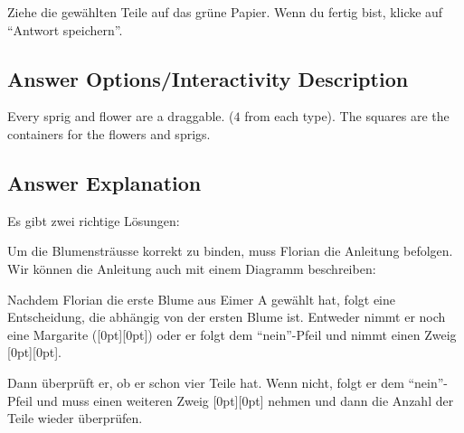 \documentclass[a4paper,11pt]{report}
\newcommand{\taskGraphicsFolder}{..}
\begin{document}
Ziehe die gewählten Teile auf das grüne Papier. Wenn du fertig bist, klicke auf \enquote{Antwort speichern}.

\begingroup
\renewcommand{\arraystretch}{1.5}
\subsection*{Answer Options/Interactivity Description}

Every sprig and flower are a draggable. ($4$ from each type). The squares are the containers for the flowers and sprigs.

\endgroup

\subsection*{Answer Explanation}

Es gibt zwei richtige Lösungen:

{\centering%
\raisebox{-0.5ex}{}
\raisebox{-0.5ex}{}\par}

Um die Blumensträusse korrekt zu binden, muss Florian die Anleitung befolgen. Wir können die Anleitung auch mit einem Diagramm beschreiben:

{\centering%
\par}

Nachdem Florian die erste Blume aus Eimer A gewählt hat, folgt eine Entscheidung, die abhängig von der ersten Blume ist. Entweder nimmt er noch eine Margarite (\raisebox{\dimexpr -0.5ex -1.0ex \relax}[0pt][0pt]{}) oder er folgt dem \enquote{nein}-Pfeil und nimmt einen Zweig \raisebox{\dimexpr -0.5ex -0.5ex \relax}[0pt][0pt]{}.

Dann überprüft er, ob er schon vier Teile hat.
Wenn nicht, folgt er dem \enquote{nein}-Pfeil und muss einen weiteren Zweig \raisebox{\dimexpr -0.5ex -0.5ex \relax}[0pt][0pt]{} nehmen und dann die Anzahl der Teile wieder überprüfen.
\end{document}
